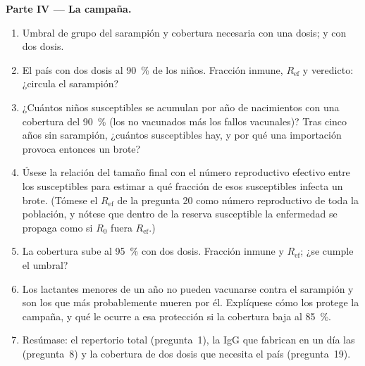 \begin{problem}
\medskip
\noindent\textbf{Parte IV --- La campaña.}
\begin{enumerate}[resume]
  \item Umbral de grupo del sarampión y cobertura necesaria con una
        dosis; y con dos dosis.
  \item El país  con dos dosis al \qty{90}{\%} de los niños.
        Fracción inmune, $R_{\text{ef}}$ y veredicto: ¿circula el
        sarampión?
  \item ¿Cuántos niños susceptibles se acumulan por año de nacimientos
        con una cobertura del \qty{90}{\%} (los no vacunados más los
        fallos vacunales)? Tras cinco años sin sarampión, ¿cuántos
        susceptibles hay, y por qué una importación provoca entonces un
        brote?
  \item Úsese la relación del tamaño final con el número reproductivo
        efectivo entre los susceptibles para estimar a qué fracción de
        esos susceptibles infecta un brote. (Tómese el
        $R_{\text{ef}}$ de la pregunta 20 como número reproductivo de
        toda la población, y nótese que dentro de la reserva susceptible
        la enfermedad se propaga como si $R_{0}$ fuera
        $R_{\text{ef}}$.)
  \item La cobertura sube al \qty{95}{\%} con dos dosis. Fracción inmune
        y $R_{\text{ef}}$; ¿se cumple el umbral?
  \item Los lactantes menores de un año no pueden vacunarse contra el
        sarampión y son los que más probablemente mueren por él.
        Explíquese cómo los protege la campaña, y qué le ocurre a esa
        protección si la cobertura baja al \qty{85}{\%}.
  \item Resúmase: el repertorio total (pregunta~1), la IgG que fabrican
        en un día las  (pregunta~8) y la cobertura de
        dos dosis que necesita el país (pregunta~19).
\end{enumerate}
\end{problem}
